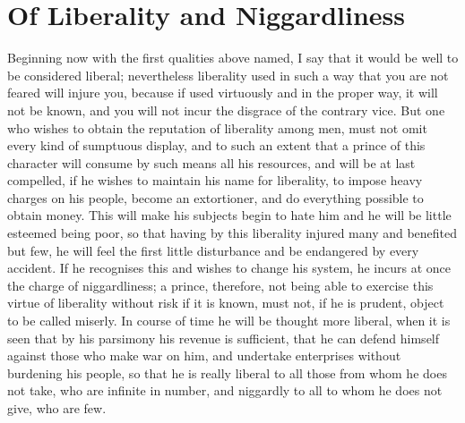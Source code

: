 \documentclass[12pt,letterpaper]{memoir}
\begin{document}
\chapter{Of Liberality and Niggardliness}

Beginning now with the first qualities above named, I say that it
would be well to be considered liberal; nevertheless liberality used
in such a way that you are not feared will injure you, because if
used virtuously and in the proper way, it will not be known, and you
will not incur the disgrace of the contrary vice. But one who wishes
to obtain the reputation of liberality among men, must not omit every
kind of sumptuous display, and to such an extent that a prince of this
character will consume by such means all his resources, and will be
at last compelled, if he wishes to maintain his name for liberality,
to impose heavy charges on his people, become an extortioner, and do
everything possible to obtain money. This will make his subjects begin
to hate him and he will be little esteemed being poor, so that having
by this liberality injured many and benefited but few, he will feel
the first little disturbance and be endangered by every accident. If
he recognises this and wishes to change his system, he incurs at once
the charge of niggardliness; a prince, therefore, not being able to
exercise this virtue of liberality without risk if it is known, must
not, if he is prudent, object to be called miserly. In course of time
he will be thought more liberal, when it is seen that by his parsimony
his revenue is sufficient, that he can defend himself against those
who make war on him, and undertake enterprises without burdening his
people, so that he is really liberal to all those from whom he does not
take, who are infinite in number, and niggardly to all to whom he does
not give, who are few.
\end{document}
